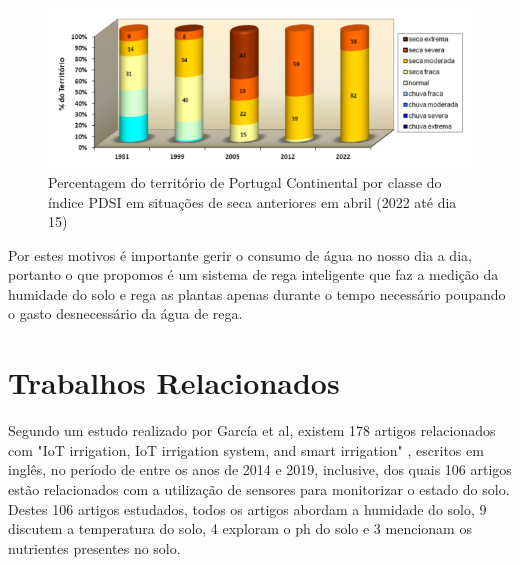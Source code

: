 \documentclass[conference]{IEEEtran}
\begin{document}
\begin{figure}[h]
    \centering
    \includegraphics[scale=0.5]{grafico-seca-portugal.png}
    \caption{Percentagem do território de Portugal Continental por classe do índice PDSI em situações de seca anteriores em abril (2022 até dia 15)}
    \label{fig:ipmagraph}
\end{figure}

Por estes motivos é importante gerir o consumo de água no nosso dia a dia, 
portanto o que propomos é um sistema de rega inteligente que faz a 
medição da humidade do solo e rega as plantas apenas durante o tempo 
necessário poupando o gasto desnecessário da água de rega.

\section{Trabalhos Relacionados}

Segundo um estudo realizado por García et al, existem 178 artigos 
relacionados com  "IoT irrigation, IoT irrigation system, and smart 
irrigation" \cite{garcia2020iot}, escritos em inglês, no período de entre os 
anos de 2014 e 2019, inclusive, dos quais 106 artigos estão relacionados com a 
utilização de sensores para monitorizar o estado do solo. Destes 106 artigos 
estudados, todos os artigos abordam a humidade do solo, 9 discutem a temperatura 
do solo, 4 exploram o ph do solo e 3 mencionam os nutrientes presentes no solo.
\end{document}
